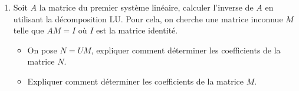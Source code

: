 \begin{enumerate}
{\begin{solution}
                On résout maintenant $U X = Y$ :
                \[
                    \begin{pmatrix}
                        1 & 1 & 2 \\
                        0 & 1 & -1 \\
                        0 & 0 & -4
                    \end{pmatrix}
                    \begin{pmatrix}
                        x_1 \\
                        x_2 \\
                        x_3
                    \end{pmatrix}
                    = \begin{pmatrix} 3 \\ -2 \\ -8 \end{pmatrix}
                \]
                C'est un système triangulaire : 
                \begin{align*}
                    x_3 &= \frac{-8}{-4} = 2 \\
                    x_2 &= -2 + x_3 = -2 + 2 = 0 \\
                    x_1 &= 3 - x_2 - 2x_3 = 3 - 0 - 4 = -1
                \end{align*}
                On a donc $X = \begin{pmatrix} -1 \\ 0 \\ 2 \end{pmatrix}$.

                On peut vérifier que ce vecteur est bien solution du système initial.
        \end{solution}
    }{}

    \item Soit $A$ la matrice du premier système linéaire, calculer l'inverse de $A$ en utilisant la décomposition LU.\newline
    Pour cela, on cherche une matrice inconnue $M$ telle que $A M = I$ où $I$ est la matrice identité.
    \begin{itemize}
        \item On pose $N = UM$, expliquer comment déterminer les coefficients de la matrice $N$. 
        \item Expliquer comment déterminer les coefficients de la matrice $M$.
    \end{itemize}
\end{enumerate}
